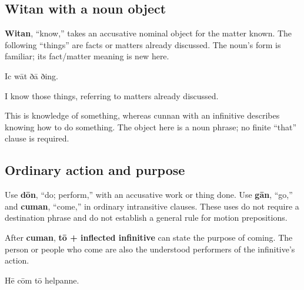\subsection*{Witan with a noun object}

\textbf{Witan}, “know,” takes an accusative nominal object for the matter known. The following “things” are facts or matters already discussed. The noun’s form is familiar; its fact/\allowbreak{}matter meaning is new here.

Ic wāt ðā ðing.

I know those things, referring to matters already discussed.

This is knowledge of something, whereas cunnan with an infinitive describes knowing how to do something. The object here is a noun phrase; no finite “that” clause is required.

\subsection*{Ordinary action and purpose}

Use \textbf{dōn}, “do; perform,” with an accusative work or thing done. Use \textbf{gān}, “go,” and \textbf{cuman}, “come,” in ordinary intransitive clauses. These uses do not require a destination phrase and do not establish a general rule for motion prepositions.

After \textbf{cuman}, \textbf{tō + inflected infinitive} can state the purpose of coming. The person or people who come are also the understood performers of the infinitive’s action.

Hē cōm tō helpanne.

